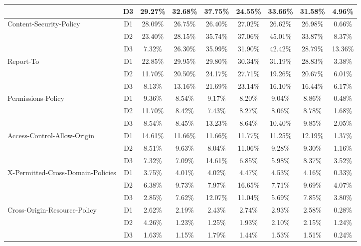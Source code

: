 \begin{table}[!ht]
\begin{tabular}{l|c|c|c|c|c|c|c|c}
        ~ & D3 & 29.27\% & 32.68\% & 37.75\% & 24.55\% & 33.66\% & 31.58\% & 4.96\% \\ \hline
        \multirow{3}{*}{Content-Security-Policy} & D1 & 28.09\% & 26.75\% & 26.40\% & 27.02\% & 26.62\% & 26.98\% & 0.66\% \\
        ~ & D2 & 23.40\% & 28.15\% & 35.74\% & 37.06\% & 45.01\% & 33.87\% & 8.37\% \\
        ~ & D3 & 7.32\% & 26.30\% & 35.99\% & 31.90\% & 42.42\% & 28.79\% & 13.36\% \\ \hline
        \multirow{3}{*}{Report-To} & D1 & 22.85\% & 29.95\% & 29.80\% & 30.34\% & 31.19\% & 28.83\% & 3.38\% \\
        ~ & D2 & 11.70\% & 20.50\% & 24.17\% & 27.71\% & 19.26\% & 20.67\% & 6.01\% \\
        ~ & D3 & 8.13\% & 13.16\% & 21.69\% & 23.14\% & 16.10\% & 16.44\% & 6.17\% \\ \hline
        \multirow{3}{*}{Permissions-Policy} & D1 & 9.36\% & 8.54\% & 9.17\% & 8.20\% & 9.04\% & 8.86\% & 0.48\% \\
        ~ & D2 & 11.70\% & 8.42\% & 7.43\% & 8.27\% & 8.06\% & 8.78\% & 1.68\% \\
        ~ & D3 & 8.54\% & 8.45\% & 13.23\% & 8.64\% & 10.40\% & 9.85\% & 2.05\% \\ \hline
        \multirow{3}{*}{Access-Control-Allow-Origin} & D1 & 14.61\% & 11.66\% & 11.66\% & 11.77\% & 11.25\% & 12.19\% & 1.37\% \\
        ~ & D2 & 8.51\% & 9.63\% & 8.04\% & 11.06\% & 9.28\% & 9.30\% & 1.16\% \\
        ~ & D3 & 7.32\% & 7.09\% & 14.61\% & 6.85\% & 5.98\% & 8.37\% & 3.52\% \\ \hline
        \multirow{3}{*}{X-Permitted-Cross-Domain-Policies} & D1 & 3.75\% & 4.01\% & 4.02\% & 4.47\% & 4.53\% & 4.16\% & 0.33\% \\
        ~ & D2 & 6.38\% & 9.73\% & 7.97\% & 16.65\% & 7.71\% & 9.69\% & 4.07\% \\
        ~ & D3 & 2.85\% & 7.62\% & 12.07\% & 11.04\% & 5.69\% & 7.85\% & 3.80\% \\ \hline
        \multirow{3}{*}{Cross-Origin-Resource-Policy} & D1 & 2.62\% & 2.19\% & 2.43\% & 2.74\% & 2.93\% & 2.58\% & 0.28\% \\
        ~ & D2 & 4.26\% & 1.23\% & 1.25\% & 1.93\% & 2.10\% & 2.15\% & 1.24\% \\
        ~ & D3 & 1.63\% & 1.15\% & 1.79\% & 1.44\% & 1.53\% & 1.51\% & 0.24\% \\ \hline

\end{tabular}
\end{table}
